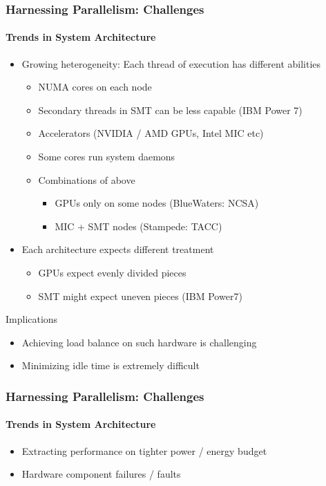 \begin{frame}[t]
\frametitle{Harnessing Parallelism: Challenges}
\framesubtitle{Trends in System Architecture}
    \begin{itemize}
        \item Growing heterogeneity: Each thread of execution has different abilities
            \begin{itemize}
                \item NUMA cores on each node
                \item Secondary threads in SMT can be less capable (IBM Power 7)
                \item Accelerators (NVIDIA / AMD GPUs, Intel MIC etc)
                \item Some cores run system daemons
                \item Combinations of above
                    \begin{itemize}
                        \item GPUs only on some nodes (BlueWaters: NCSA)
                        \item MIC + SMT nodes (Stampede: TACC)
                    \end{itemize}
            \end{itemize}
        \pause
        \item Each architecture expects different treatment
            \begin{itemize}
                \item GPUs expect evenly divided pieces
                \item SMT might expect uneven pieces (IBM Power7)
            \end{itemize}
    \end{itemize}
    \pause
    \begin{block}{Implications}
        \begin{itemize}
            \item Achieving load balance on such hardware is challenging
            \item Minimizing idle time is extremely difficult
        \end{itemize}
    \end{block}
\end{frame}


\begin{frame}[t]
\frametitle{Harnessing Parallelism: Challenges}
\framesubtitle{Trends in System Architecture}
  \begin{itemize}
  \item Extracting performance on tighter power / energy budget
  \item Hardware component failures / faults
  \end{itemize}
\end{frame}


